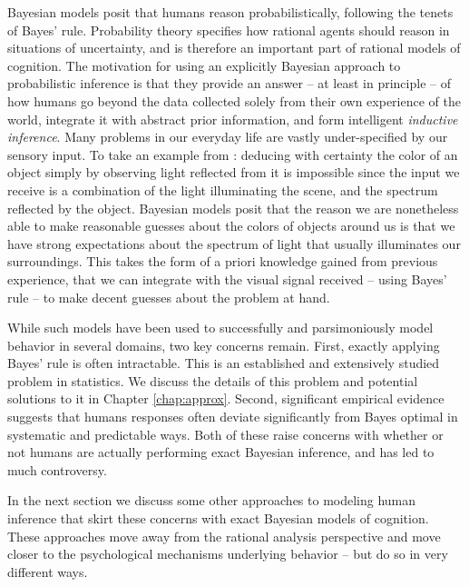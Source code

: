 Bayesian models posit that humans reason probabilistically, following the tenets of Bayes' rule. Probability theory specifies how rational agents should reason in situations of uncertainty\cite{hacking2006emergence, gigerenzer1990empire}, and is therefore an important part of rational models of cognition. The motivation for using an explicitly Bayesian approach to probabilistic inference is that they provide an answer -- at least in principle -- of how humans go beyond the data collected solely from their own experience of the world, integrate it with abstract prior information, and form intelligent \textit{inductive inference}. Many problems in our everyday life are vastly under-specified by our sensory input. To take an example from \citet{griffiths2008bayesian}: deducing with certainty the color of an object simply by observing light reflected from it is impossible since the input we receive is a combination of the light illuminating the scene, and the spectrum reflected by the object. Bayesian models posit that the reason we are nonetheless able to make reasonable guesses about the colors of objects around us is that we have strong expectations about the spectrum of light that usually illuminates our surroundings. This takes the form of a priori knowledge gained from previous experience, that we can integrate with the visual signal received -- using Bayes' rule -- to make decent guesses about the problem at hand.

While such models have been used to successfully and parsimoniously model behavior in several domains, two key concerns remain. First, exactly applying Bayes' rule is often intractable. This is an established and extensively studied problem in statistics. We discuss the details of this problem and potential solutions to it in Chapter \ref{chap:approx}. Second, significant empirical evidence suggests that humans responses often deviate significantly from Bayes optimal in systematic and predictable ways\citep{tversky1974judgment, slovic1971comparison, grether1980bayes, fischhoff1983hypothesis}. Both of these raise concerns with whether or not humans are actually performing exact Bayesian inference, and has led to much controversy\citep{mellers2001frequency, gigerenzer1996narrow, samuels2012ending}. 

In the next section we discuss some other approaches to modeling human inference that skirt these concerns with exact Bayesian models of cognition. These approaches move away from the rational analysis perspective and move closer to the psychological mechanisms underlying behavior -- but do so in very different ways.

